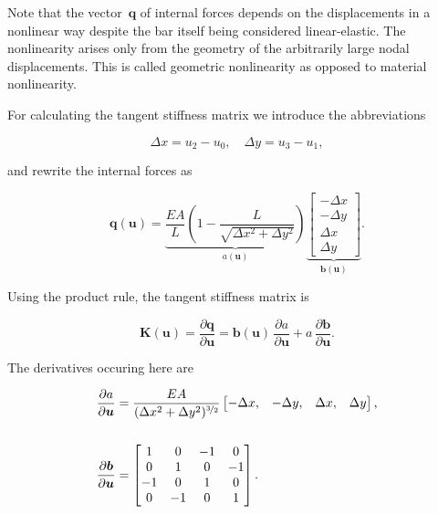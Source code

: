 Note that the vector~$\boldsymbol{q}$ of internal forces depends on the displacements in a nonlinear way despite the bar itself being considered linear-elastic. The nonlinearity arises only from the geometry of the arbitrarily large nodal displacements. This is called geometric nonlinearity as opposed to material nonlinearity.

For calculating the tangent stiffness matrix we introduce the abbreviations

\begin{equation}
\Delta x = u_{2} - u_{0},\quad \Delta y = u_{3} - u_{1},
\end{equation}

and rewrite the internal forces as

\begin{equation}
\boldsymbol{q}(\boldsymbol{u}) =
\underbrace{
\frac{EA}{L}\left(1 - \frac{L}{\sqrt{\Delta x^2 + \Delta y^2}}\right)
}_{a(\boldsymbol{u})}
\underbrace{
\begin{bmatrix}
-\Delta x\\
-\Delta y\\
\Delta x\\
\Delta y
\end{bmatrix}
}_{\boldsymbol{b}(\boldsymbol{u})}.
\end{equation}

Using the product rule, the tangent stiffness matrix is

\begin{equation}
\boldsymbol{K}(\boldsymbol{u}) = \frac{\partial \boldsymbol{q}}{\partial \boldsymbol{u}} = \boldsymbol{b}(\boldsymbol{u})\,\frac{\partial a}{\partial \boldsymbol{u}} + a\,\frac{\partial \boldsymbol{b}}{\partial \boldsymbol{u}}.
\end{equation}

The derivatives occuring here are

\begin{align}
\frac{\partial a}{\partial \boldsymbol{u}} &= \frac{EA}{(\Delta x^2 + \Delta y^2)^{\nicefrac{3}{2}}}
\begin{bmatrix}
-\Delta x, & -\Delta y, & \Delta x, & \Delta y
\end{bmatrix},\\
\notag\\
\frac{\partial \boldsymbol{b}}{\partial \boldsymbol{u}} &=
\begin{bmatrix}
1 & 0 & -1 & 0\\
0 & 1 & 0 & -1\\
-1 & 0 & 1 & 0\\
0 & -1 & 0 & 1
\end{bmatrix}.
\end{align}


